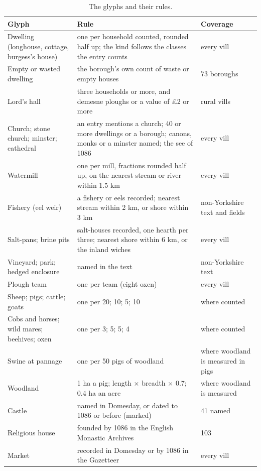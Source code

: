 \documentclass[11pt,a4paper]{article}
\begin{document}
\begin{table}[H]\centering\footnotesize
\caption{The glyphs and their rules.}\label{tab:glyphs}
\begin{tabular}{p{4.2cm}p{7.8cm}p{2.6cm}}\toprule Glyph & Rule & Coverage \\ \midrule

Dwelling (longhouse, cottage, burgess's house) & one per household counted, rounded half up; the kind follows the classes the entry counts & every vill \\
Empty or wasted dwelling & the borough's own count of waste or empty houses & 73 boroughs \\
Lord's hall & three households or more, and demesne ploughs or a value of \pounds 2 or more & rural vills \\
Church; stone church; minster; cathedral & an entry mentions a church; 40 or more dwellings or a borough; canons, monks or a minster named; the see of 1086 & every vill \\
Watermill & one per mill, fractions rounded half up, on the nearest stream or river within 1.5 km & every vill \\
Fishery (eel weir) & a fishery or eels recorded; nearest stream within 2 km, or shore within 3 km & non-Yorkshire text and fields \\
Salt-pans; brine pits & salt-houses recorded, one hearth per three; nearest shore within 6 km, or the inland wiches & every vill \\
Vineyard; park; hedged enclosure & named in the text & non-Yorkshire text \\
Plough team & one per team (eight oxen) & every vill \\
Sheep; pigs; cattle; goats & one per 20; 10; 5; 10 & where counted \\
Cobs and horses; wild mares; beehives; oxen & one per 3; 5; 5; 4 & where counted \\
Swine at pannage & one per 50 pigs of woodland & where woodland is measured in pigs \\
Woodland & 1 ha a pig; length $\times$ breadth $\times$ 0.7; 0.4 ha an acre & where woodland is measured \\
Castle & named in Domesday, or dated to 1086 or before (marked) & 41 named \\
Religious house & founded by 1086 in the English Monastic Archives & 103 \\
Market & recorded in Domesday or by 1086 in the Gazetteer & every vill \\

\end{tabular}
\end{table}
\end{document}
